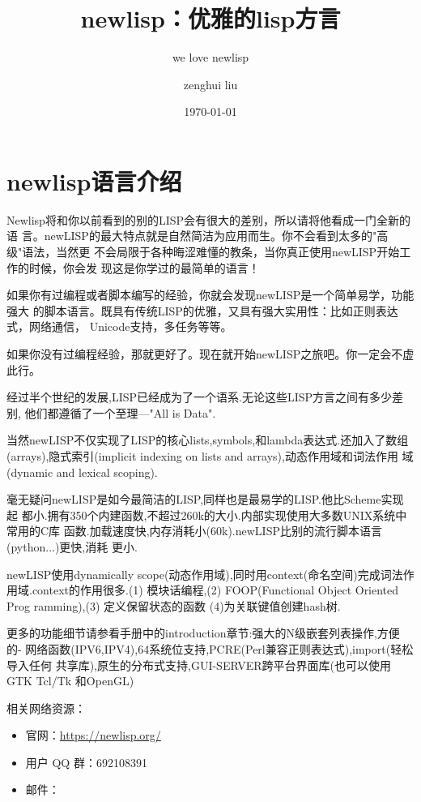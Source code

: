 \documentclass[cn,11pt]{elegantbook}
\title{newlisp：优雅的lisp方言}
\subtitle{we love newlisp}
\author{zenghui liu}
\institute{newlisp\funs}
\date{\today}
\begin{document}
\maketitle
\tableofcontents


\mainmatter
\hypersetup{pageanchor=true}

\chapter{newlisp语言介绍}

Newlisp将和你以前看到的别的LISP会有很大的差别，所以请将他看成一门全新的语
言。newLISP的最大特点就是自然简洁为应用而生。你不会看到太多的"高级"语法，当然更
不会局限于各种晦涩难懂的教条，当你真正使用newLISP开始工作的时候，你会发
现这是你学过的最简单的语言！

如果你有过编程或者脚本编写的经验，你就会发现newLISP是一个简单易学，功能强大
的脚本语言。既具有传统LISP的优雅，又具有强大实用性：比如正则表达式，网络通信，
Unicode支持，多任务等等。

如果你没有过编程经验，那就更好了。现在就开始newLISP之旅吧。你一定会不虚此行。


经过半个世纪的发展,LISP已经成为了一个语系.无论这些LISP方言之间有多少差别,
他们都遵循了一个至理---"All is Data".

当然newLISP不仅实现了LISP的核心lists,symbols,和lambda表达式.还加入了数组
(arrays),隐式索引(implicit indexing on lists and arrays),动态作用域和词法作用
域(dynamic  and lexical scoping).

毫无疑问newLISP是如今最简洁的LISP,同样也是最易学的LISP.他比Scheme实现起  都小.拥有350个内建函数,不超过260k的大小.内部实现使用大多数UNIX系统中常用的C库
函数.加载速度快,内存消耗小(60k).newLISP比别的流行脚本语言(python...)更快,消耗
更小.

newLISP使用dynamically scope(动态作用域),同时用context(命名空间)完成词法作
用域.context的作用很多.(1) 模块话编程,(2) FOOP(Functional Object Oriented Prog
ramming),(3) 定义保留状态的函数 (4)为关联键值创建hash树.

更多的功能细节请参看手册中的introduction章节:强大的N级嵌套列表操作,方便的- 网络函数(IPV6,IPV4),64系统位支持,PCRE(Perl兼容正则表达式),import(轻松导入任何
共享库),原生的分布式支持,GUI-SERVER跨平台界面库(也可以使用GTK Tcl/Tk 和OpenGL)
 

相关网络资源：
\begin{itemize}
\item 官网：\href{https://newlisp.org/}{https://newlisp.org/}
\item 用户 QQ 群：692108391 
\item 邮件：
\end{itemize}
\end{document}

